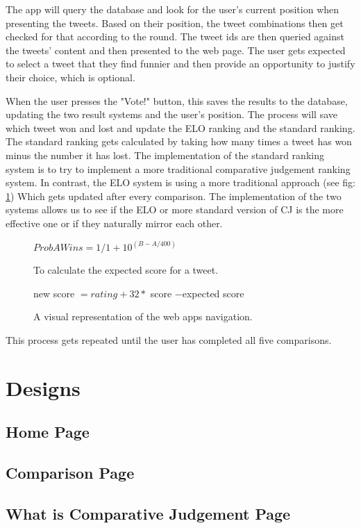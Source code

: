 	The app will query the database and look for the user's current position when presenting the tweets. Based on their position, the tweet combinations then get checked for that according to the round. The tweet ids are then queried against the tweets' content and then presented to the web page. The user gets expected to select a tweet that they find funnier and then provide an opportunity to justify their choice, which is optional.   
	
	When the user presses the "Vote!" button, this saves the results to the database, updating the two result systems and the user's position. The process will save which tweet won and lost and update the ELO ranking and the standard ranking. The standard ranking gets calculated by taking how many times a tweet has won minus the number it has lost. The implementation of the standard ranking system is to try to implement a more traditional comparative judgement ranking system. In contrast, the ELO system is using a more traditional approach (see fig: \ref{fig:elo_maths}) Which gets updated after every comparison. The implementation of the two systems allows us to see if the ELO or more standard version of CJ is the more effective one or if they naturally mirror each other.
	
	\begin{figure}[t]
		\centering
		$ Prob A Wins = 1/1+10^{(B-A/400)}$
		\caption{To calculate the expected score for a tweet.}
		new score $= rating + 32 * $  score $ - $expected score
		\caption{A visual representation of the web apps navigation.}
		\label{fig:elo_maths}
		
	\end{figure}
	
	This process gets repeated until the user has completed all five comparisons.
	
	\section{Designs}
	
	\subsection{Home Page}
	
	\subsection{Comparison Page}
	
	\subsection{What is Comparative Judgement Page}
	
